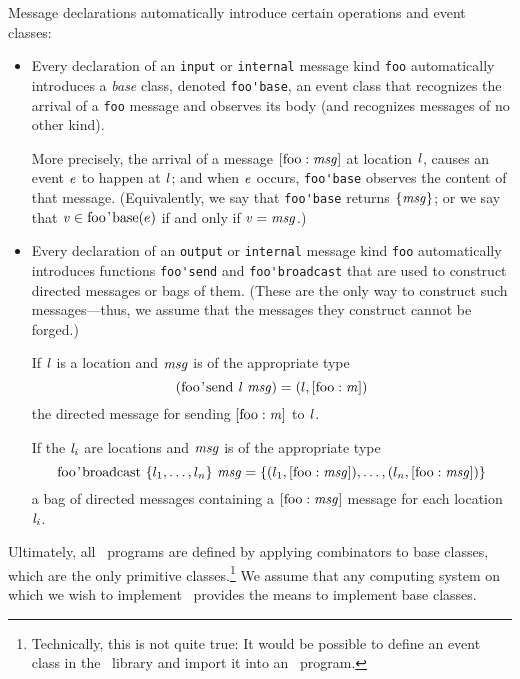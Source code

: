 \documentclass[final]{article}
\newcommand{\dgclassrel}[3]{\NUPRLclassrel{}{#1}{}{#2}{#3}}
\newcommand{\listinline}[1]{\text{\lstinline{#1}}}
\newcommand{\msg}[2]{\ensuremath{[\listinline{#1}:\NUPRL{#2}]}}
\begin{document}
Message declarations automatically introduce certain operations and
event classes:
\begin{itemize}
\item
Every declaration of an \lstinline{input} or \lstinline{internal}
message kind \lstinline{foo} automatically introduces a \emph{base}
class,
%
%
denoted \lstinline{foo'base}, an event class that recognizes the arrival
of a \lstinline{foo} message and observes its body (and recognizes
messages of no other kind).

More precisely, the arrival of a message \msg{foo}{msg} at location
$\mathit{l}$, causes an event $\mathit{e}$ to happen at $\mathit{l}$;
and when $\mathit{e}$ occurs, \lstinline{foo'base} observes the
content of that message.  (Equivalently, we say that
\lstinline{foo'base} returns $\{\mathit{msg}\}$; or we say that
$\dgclassrel{e}{\listinline{foo'base}}{\NUPRL{v}}$ if and only if
$\mathit{v} = \mathit{msg}$.)

\item
Every declaration of an \lstinline{output} or \lstinline{internal}
message kind \lstinline{foo} automatically introduces functions
\lstinline{foo'send} and \lstinline{foo'broadcast} that are used to
construct directed messages or bags of them.  (These are the only way
to construct such messages---thus, we assume that the messages they
construct cannot be forged.)

If $\mathit{l}$ is a location and $\mathit{msg}$ is of the appropriate
type
\[
(\listinline{foo'send}~\NUPRL{l}~\NUPRL{msg}) =
\NUPRL(l,\msg{foo}{m})
\]
the directed message for sending \msg{foo}{m} to $\mathit{l}$.

If the $\mathit{l_i}$ are locations and $\mathit{msg}$ is of the
appropriate type
\[
\listinline{foo'broadcast}~\{l_1,\ldots,l_n\}~\NUPRL{msg} =
  \{(l_1,\msg{foo}{msg}), \ldots, (l_n,\msg{foo}{msg}) \}
\]
a bag of directed messages containing a
\msg{foo}{msg} message for each location $\mathit{l_i}$.
\end{itemize}


Ultimately, all \eml\ programs are defined by applying combinators to
base classes, which are the only primitive
classes.\footnote{Technically, this is not quite true: It would be
  possible to define an event class in the \nuprl\ library and import it
  into an \eml\ program.}  We assume that any computing system on
which we wish to implement \eml\ provides the means to implement base
classes.
\end{document}
